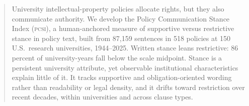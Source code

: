 %
%


\begin{abstract}
University intellectual-property policies allocate rights, but they also communicate authority. We develop the Policy Communication Stance Index (\textsc{pcsi}), a human-anchored measure of supportive versus restrictive stance in policy text, built from 87,159 sentences in 518 policies at 150 U.S.\ research universities, 1944--2025. Written stance leans restrictive: 86 percent of university-years fall below the scale midpoint. Stance is a persistent university attribute, yet observable institutional characteristics explain little of it. It tracks supportive and obligation-oriented wording rather than readability or legal density, and it drifts toward restriction over recent decades, within universities and across clause types.
\end{abstract}


